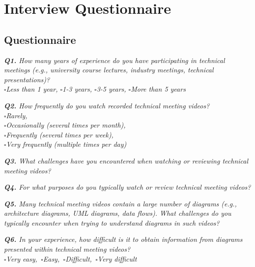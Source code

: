 \section{Interview Questionnaire}
\label{appendix:interviews}
\subsection{Questionnaire}
\label{appendix:questionnaire}



\vspace*{1em}\noindent\textit{\textbf{Q1.} How many years of experience do you have participating in technical meetings (e.g., university course lectures, industry meetings, technical presentations)?
\\[.5em]
        \indent $\square$Less than 1 year,
        $\square$1-3 years,
        $\square$3-5 years,
        $\square$More than 5 years
}


\vspace*{1em}
\noindent\textit{\textbf{Q2.} How frequently do you watch recorded technical meeting videos?
\\[.5em]
        \indent $\square$Rarely,\\
        \indent$\square$Occasionally (several times per month),\\
        \indent$\square$Frequently (several times per week),\\
        \indent$\square$Very frequently (multiple times per day)
}

\vspace*{1em}\noindent\textit{\textbf{Q3.} What challenges have you encountered when watching or reviewing technical meeting videos? 
}

\vspace*{1em}\noindent\textit{\textbf{Q4.} For what purposes do you typically watch or review technical meeting videos?
}

\vspace*{1em}\noindent\textit{\textbf{Q5.} Many technical meeting videos contain a large number of diagrams (e.g., architecture diagrams, UML diagrams, data flows). 
What challenges do you typically encounter when trying to understand diagrams in such videos?
}


\vspace*{1em}\noindent\textit{\textbf{Q6.} In your experience, how difficult is it to obtain information from diagrams presented within  technical meeting videos?
\\[.5em]
        \indent $\square$Very easy,\,
        $\square$Easy,\,
        $\square$Difficult,\,
        $\square$Very difficult
}



